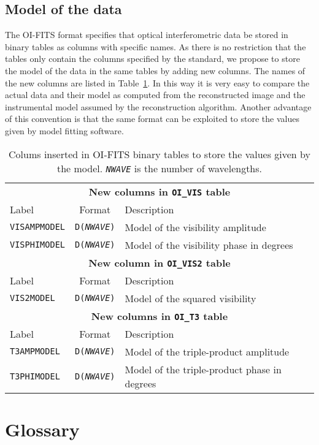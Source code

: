\documentclass{article}
\newcommand*{\ROW}{} %
\newcommand*{\ROWTITLE}{} %
\begin{document}
\subsection{Model of the data}

The OI-FITS format \citep{Pauls_et_al-2005-oifits} specifies that optical
interferometric data be stored in binary tables as columns with specific
names.  As there is no restriction that the tables only contain the columns
specified by the standard, we propose to store the model of the data in the
same tables by adding new columns.  The names of the new columns are listed in
Table~\ref{tab:model-columns}.  In this way it is very easy to compare the
actual data and their model as computed from the reconstructed image and the
instrumental model assumed by the reconstruction algorithm.  Another advantage
of this convention is that the same format can be exploited to store the
values given by model fitting software.

\renewcommand{\ROW}[2]{\texttt{#1} & \texttt{D(\textsl{NWAVE})} & #2 \\}
\renewcommand{\ROWTITLE}[1]{\multicolumn{3}{c}{\textbf{#1}}\\}

\begin{table}
\caption{Colums inserted in OI-FITS binary tables to store the values given by
the model.  \texttt{\textsl{NWAVE}} is the number of wavelengths.
\label{tab:model-columns}}
\begin{tabular}{lcl}
\hline
\hline
\ROWTITLE{New columns in \texttt{OI\_VIS} table}
Label & Format & Description \\
\hline
\ROW{VISAMPMODEL}{Model of the visibility amplitude}
\ROW{VISPHIMODEL}{Model of the visibility phase in degrees}
\hline
\hline
\ROWTITLE{New column in \texttt{OI\_VIS2} table}
Label & Format & Description \\
\hline
\ROW{VIS2MODEL}{Model of the squared visibility}
\hline
\hline
\ROWTITLE{New columns in \texttt{OI\_T3} table}
Label & Format & Description \\
\hline
\ROW{T3AMPMODEL}{Model of the triple-product amplitude}
\ROW{T3PHIMODEL}{Model of the triple-product phase in degrees}
\hline
\end{tabular}
\end{table}

\appendix
\section{Glossary}
\end{document}
